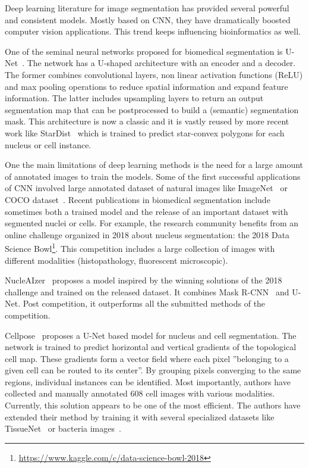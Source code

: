 Deep learning literature for image segmentation has provided several powerful and consistent models.
Mostly based on \ac{CNN}, they have dramatically boosted computer vision applications.
This trend keeps influencing bioinformatics as well.

One of the seminal neural networks proposed for biomedical segmentation is U-Net~\cite{Ronneberger_unet}.
The network has a U-shaped architecture with an encoder and a decoder.
The former combines convolutional layers, non linear activation functions (ReLU) and max pooling operations to reduce spatial information and expand feature information.
The latter includes upsampling layers to return an output segmentation map that can be postprocessed to build a (semantic) segmentation mask.
This architecture is now a classic and it is vastly reused by more recent work like StarDist~\cite{schmidt2018} which is trained to predict star-convex polygons for each nucleus or cell instance.

One the main limitations of deep learning methods is the need for a large amount of annotated images to train the models.
Some of the first successful applications of \ac{CNN} involved large annotated dataset of natural images like ImageNet~\cite{Deng_2009} or COCO dataset~\cite{Lin_2014}.
Recent publications in biomedical segmentation include sometimes both a trained model and the release of an important dataset with segmented nuclei or cells.
For example, the research community benefits from an online challenge organized in 2018 about nucleus segmentation: the 2018 Data Science Bowl\footnote{\url{https://www.kaggle.com/c/data-science-bowl-2018}}.
This competition includes a large collection of images with different modalities (histopathology, fluorescent microscopic).

NucleAIzer~\cite{hollandi_nucleaizer_2020} proposes a model inspired by the winning solutions of the 2018 challenge and trained on the released dataset.
It combines Mask R-CNN~\cite{He_2017_ICCV} and U-Net.
Post competition, it outperforms all the submitted methods of the competition.

Cellpose~\cite{stringer_cellpose_2021} proposes a U-Net based model for nucleus and cell segmentation.
The network is trained to predict horizontal and vertical gradients of the topological cell map.
These gradients form a vector field where each pixel ''belonging to a given cell can be routed to its center''.
By grouping pixels converging to the same regions, individual instances can be identified.
Most importantly, authors have collected and manually annotated 608 cell images with various modalities.
Currently, this solution appears to be one of the most efficient.
The authors have extended their method by training it with several specialized datasets like TissueNet~\cite{Greenwald_2022} or bacteria images~\cite{cutler_omnipose_2022}.

